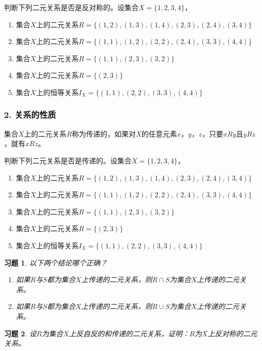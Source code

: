 \documentclass{beamer}
\newtheorem*{Exercise}{习题}
\begin{document}
\begin{CJK*}{UTF8}{gbsn}
\begin{frame}
    判断下列二元关系是否是反对称的。设集合$X=\{1,2,3,4\}$，
  \begin{enumerate}
  \item 集合$X$上的二元关系$R=\{(1,2), (1,3), (1,4), (2,3),
    (2,4), (3,4)\}$
  \item 集合$X$上的二元关系$R=\{(1,1), (1,2), (2,2),
    (2,4), (3,3), (4,4)\}$
  \item 集合$X$上的二元关系$R = \{(1,1), (2,3), (3,2)\}$
  \item 集合$X$上的二元关系$R = \{(2,3)\}$
  \item 集合$X$上的恒等关系$I_X = \{(1,1), (2,2), (3,3),(4,4)\}$
  \end{enumerate}
\end{frame}
\begin{frame}
  \frametitle{2. 关系的性质}
  \begin{Def}
        集合$X$上的二元关系$R$称为\alert{传递}的，如果对$X$的任意元素$x$，$y$，$z$，只要$xRy$且$yRz$，就有$xRz$。
      \end{Def}
        \pause
    判断下列二元关系是否是传递的。设集合$X=\{1,2,3,4\}$，
  \begin{enumerate}
  \item 集合$X$上的二元关系$R=\{(1,2), (1,3), (1,4), (2,3),
    (2,4), (3,4)\}$
  \item 集合$X$上的二元关系$R=\{(1,1), (1,2), (2,2),
    (2,4), (3,3), (4,4)\}$
  \item 集合$X$上的二元关系$R = \{(1,1), (2,3), (3,2)\}$
  \item 集合$X$上的二元关系$R = \{(2,3)\}$
  \item 集合$X$上的恒等关系$I_X = \{(1,1), (2,2), (3,3),(4,4)\}$
  \end{enumerate}
\end{frame}
\begin{frame}
  \begin{Exercise}
    以下两个结论哪个正确？
    \begin{enumerate}
    \item 如果$R$与$S$都为集合$X$上传递的二元关系，则$R\cap S$为集合$X$上传递的二元关系。
    \item 如果$R$与$S$都为集合$X$上传递的二元关系，则$R\cup S$为集合$X$上传递的二元关系。
    \end{enumerate}
  \end{Exercise}
\end{frame}
\begin{frame}
  \begin{Exercise}
    设$R$为集合$X$上反自反的和传递的二元关系，证明：$R$为$X$上反对称的二元关系。
  \end{Exercise}
\end{frame}

\end{CJK*}
\end{document}
